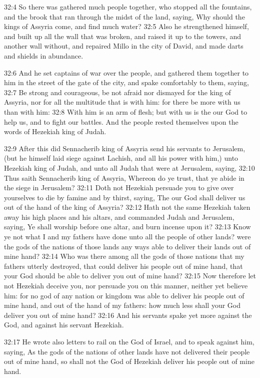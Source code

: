 32:4 So there was gathered much people together, who stopped all the fountains, and the brook that ran through the midst of the land, saying, Why should the kings of Assyria come, and find much water?  32:5 Also he strengthened himself, and built up all the wall that was broken, and raised it up to the towers, and another wall without, and repaired Millo in the city of David, and made darts and shields in abundance.

32:6 And he set captains of war over the people, and gathered them together to him in the street of the gate of the city, and spake comfortably to them, saying, 32:7 Be strong and courageous, be not afraid nor dismayed for the king of Assyria, nor for all the multitude that is with him: for there be more with us than with him: 32:8 With him is an arm of flesh; but with us is the \LORD our God to help us, and to fight our battles. And the people rested themselves upon the words of Hezekiah king of Judah.

32:9 After this did Sennacherib king of Assyria send his servants to Jerusalem, (but he himself laid siege against Lachish, and all his power with him,) unto Hezekiah king of Judah, and unto all Judah that were at Jerusalem, saying, 32:10 Thus saith Sennacherib king of Assyria, Whereon do ye trust, that ye abide in the siege in Jerusalem?  32:11 Doth not Hezekiah persuade you to give over yourselves to die by famine and by thirst, saying, The \LORD our God shall deliver us out of the hand of the king of Assyria?  32:12 Hath not the same Hezekiah taken away his high places and his altars, and commanded Judah and Jerusalem, saying, Ye shall worship before one altar, and burn incense upon it?  32:13 Know ye not what I and my fathers have done unto all the people of other lands? were the gods of the nations of those lands any ways able to deliver their lands out of mine hand?  32:14 Who was there among all the gods of those nations that my fathers utterly destroyed, that could deliver his people out of mine hand, that your God should be able to deliver you out of mine hand?  32:15 Now therefore let not Hezekiah deceive you, nor persuade you on this manner, neither yet believe him: for no god of any nation or kingdom was able to deliver his people out of mine hand, and out of the hand of my fathers: how much less shall your God deliver you out of mine hand?  32:16 And his servants spake yet more against the \LORD God, and against his servant Hezekiah.

32:17 He wrote also letters to rail on the \LORD God of Israel, and to speak against him, saying, As the gods of the nations of other lands have not delivered their people out of mine hand, so shall not the God of Hezekiah deliver his people out of mine hand.

